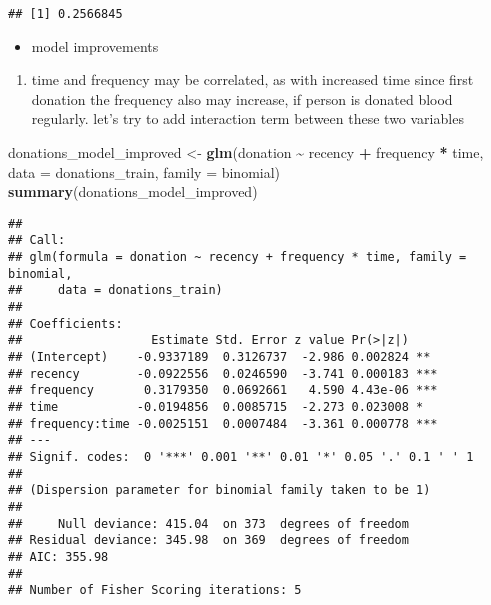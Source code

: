 \documentclass[
]{article}
\newenvironment{Shaded}{\begin{snugshade}}{\end{snugshade}}
\newcommand{\AttributeTok}[1]{\textcolor[rgb]{0.13,0.29,0.53}{#1}}
\newcommand{\DecValTok}[1]{\textcolor[rgb]{0.00,0.00,0.81}{#1}}
\newcommand{\FloatTok}[1]{\textcolor[rgb]{0.00,0.00,0.81}{#1}}
\newcommand{\FunctionTok}[1]{\textcolor[rgb]{0.13,0.29,0.53}{\textbf{#1}}}
\newcommand{\NormalTok}[1]{#1}
\newcommand{\OtherTok}[1]{\textcolor[rgb]{0.56,0.35,0.01}{#1}}
\newcommand{\SpecialCharTok}[1]{\textcolor[rgb]{0.81,0.36,0.00}{\textbf{#1}}}
\providecommand{\tightlist}{%
  \setlength{\itemsep}{0pt}\setlength{\parskip}{0pt}}
\begin{document}
\begin{Shaded}
\end{Shaded}

\begin{verbatim}
## [1] 0.2566845
\end{verbatim}

\begin{itemize}
\tightlist
\item
  model improvements
\end{itemize}

\begin{enumerate}
\def\labelenumi{\arabic{enumi}.}
\tightlist
\item
  time and frequency may be correlated, as with increased time since
  first donation the frequency also may increase, if person is donated
  blood regularly. let's try to add interaction term between these two
  variables
\end{enumerate}

\begin{Shaded}
\begin{Highlighting}[]
\NormalTok{donations\_model\_improved }\OtherTok{\textless{}{-}} \FunctionTok{glm}\NormalTok{(donation }\SpecialCharTok{\textasciitilde{}}\NormalTok{ recency }\SpecialCharTok{+}\NormalTok{ frequency }\SpecialCharTok{*}\NormalTok{ time,}
  \AttributeTok{data =}\NormalTok{ donations\_train,}
  \AttributeTok{family =}\NormalTok{ binomial)}
\FunctionTok{summary}\NormalTok{(donations\_model\_improved)}
\end{Highlighting}
\end{Shaded}

\begin{verbatim}
## 
## Call:
## glm(formula = donation ~ recency + frequency * time, family = binomial, 
##     data = donations_train)
## 
## Coefficients:
##                  Estimate Std. Error z value Pr(>|z|)    
## (Intercept)    -0.9337189  0.3126737  -2.986 0.002824 ** 
## recency        -0.0922556  0.0246590  -3.741 0.000183 ***
## frequency       0.3179350  0.0692661   4.590 4.43e-06 ***
## time           -0.0194856  0.0085715  -2.273 0.023008 *  
## frequency:time -0.0025151  0.0007484  -3.361 0.000778 ***
## ---
## Signif. codes:  0 '***' 0.001 '**' 0.01 '*' 0.05 '.' 0.1 ' ' 1
## 
## (Dispersion parameter for binomial family taken to be 1)
## 
##     Null deviance: 415.04  on 373  degrees of freedom
## Residual deviance: 345.98  on 369  degrees of freedom
## AIC: 355.98
## 
## Number of Fisher Scoring iterations: 5
\end{verbatim}
\end{document}
